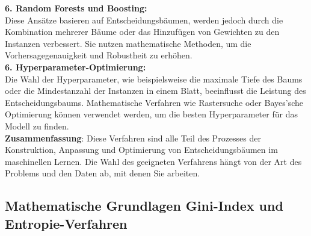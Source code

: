 \documentclass[12pt]{article}
\begin{document}
%
\textbf{6. Random Forests und Boosting:}\\
Diese Ansätze basieren auf Entscheidungsbäumen, werden jedoch durch die Kombination mehrerer Bäume oder das Hinzufügen von Gewichten zu den Instanzen verbessert. Sie nutzen mathematische Methoden, um die Vorhersagegenauigkeit und Robustheit zu erhöhen.\\[0.2cm]
%
\textbf{6. Hyperparameter-Optimierung:}\\
Die Wahl der Hyperparameter, wie beispielsweise die maximale Tiefe des Baums oder die Mindestanzahl der Instanzen in einem Blatt, beeinflusst die Leistung des Entscheidungsbaums. Mathematische Verfahren wie Rastersuche oder Bayes'sche Optimierung können verwendet werden, um die besten Hyperparameter für das Modell zu finden.\\[0.2cm]
%
\textbf{Zusammenfassung}:
Diese Verfahren sind alle Teil des Prozesses der Konstruktion, Anpassung und Optimierung von Entscheidungsbäumen im maschinellen Lernen. Die Wahl des geeigneten Verfahrens hängt von der Art des Problems und den Daten ab, mit denen Sie arbeiten.\\[0.4cm]

\subsection{Mathematische Grundlagen Gini-Index und Entropie-Verfahren}
\end{document}
